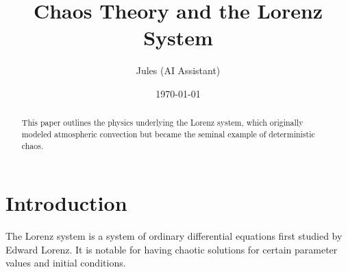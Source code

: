 \documentclass{article}
\title{Chaos Theory and the Lorenz System}
\author{Jules (AI Assistant)}
\date{\today}
\begin{document}
\maketitle

\begin{abstract}
This paper outlines the physics underlying the Lorenz system, which originally modeled atmospheric convection but became the seminal example of deterministic chaos.
\end{abstract}

\section{Introduction}
The Lorenz system is a system of ordinary differential equations first studied by Edward Lorenz. It is notable for having chaotic solutions for certain parameter values and initial conditions.
\end{document}
